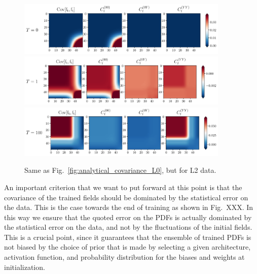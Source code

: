 \begin{figure}[ht!]
  \centering
  \includegraphics[width=0.90\textwidth]{plots/analytical_solution/covariance_ft_0_L2.pdf}
  \includegraphics[width=0.90\textwidth]{plots/analytical_solution/covariance_ft_1_L2.pdf}
  \includegraphics[width=0.90\textwidth]{plots/analytical_solution/covariance_ft_100_L2.pdf}
  \caption{Same as Fig.~\ref{fig:analytical_covariance_L0}, but for L2 data.}
  \label{fig:analytical_covariance_L2}
\end{figure}


An important criterion that we want to put forward at this point is that the covariance of the trained
fields should be dominated by the statistical error on the data. This is the case towards the end of
training as shown in Fig.~XXX. In this way we ensure that the quoted error 
on the PDFs is actually dominated by the statistical error on the data, and not by the fluctuations of the
initial fields. This is a crucial point, since it guarantees that the ensemble of trained PDFs is not biased by the
choice of prior that is made by selecting a given architecture, activation function, and probability distribution 
for the biases and weights at initialization. 

\FloatBarrier
